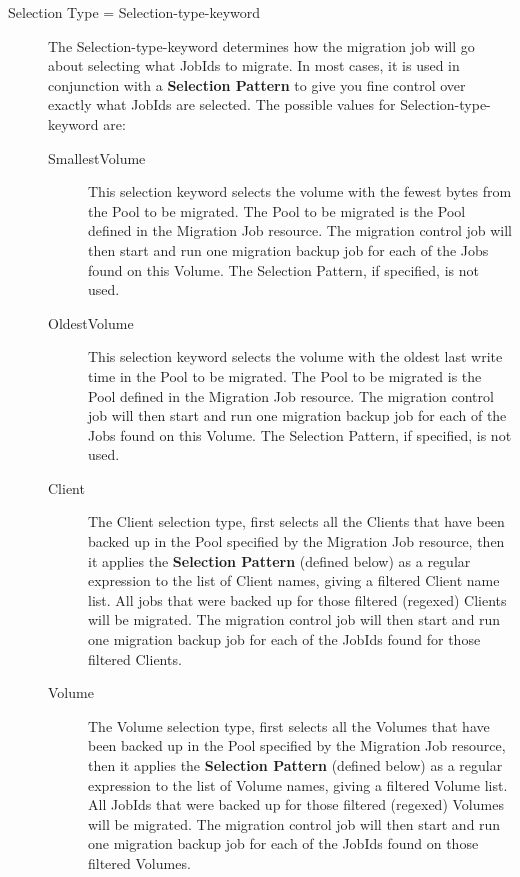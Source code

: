 \begin{description}
\item [Selection Type = \lt{}Selection-type-keyword\gt{}]  
  The \lt{}Selection-type-keyword\gt{} determines how the migration job
  will go about selecting what JobIds to migrate. In most cases, it is
  used in conjunction with a {\bf Selection Pattern} to give you fine
  control over exactly what JobIds are selected.  The possible values
  for \lt{}Selection-type-keyword\gt{} are:
  \begin{description}
  \item [SmallestVolume] This selection keyword selects the volume with the
        fewest bytes from the Pool to be migrated.  The Pool to be migrated
        is the Pool defined in the Migration Job resource.  The migration
        control job will then start and run one migration backup job for
        each of the Jobs found on this Volume.  The Selection Pattern, if
        specified, is not used.

  \item [OldestVolume] This selection keyword selects the volume with the
        oldest last write time in the Pool to be migrated.  The Pool to be
        migrated is the Pool defined in the Migration Job resource.  The
        migration control job will then start and run one migration backup
        job for each of the Jobs found on this Volume.  The Selection
        Pattern, if specified, is not used.

  \item [Client] The Client selection type, first selects all the Clients
        that have been backed up in the Pool specified by the Migration
        Job resource, then it applies the {\bf Selection Pattern} (defined
        below) as a regular expression to the list of Client names, giving
        a filtered Client name list.  All jobs that were backed up for those
        filtered (regexed) Clients will be migrated.
        The migration control job will then start and run one migration
        backup job for each of the JobIds found for those filtered Clients.

  \item [Volume] The Volume selection type, first selects all the Volumes
        that have been backed up in the Pool specified by the Migration
        Job resource, then it applies the {\bf Selection Pattern} (defined
        below) as a regular expression to the list of Volume names, giving
        a filtered Volume list.  All JobIds that were backed up for those
        filtered (regexed) Volumes will be migrated.
        The migration control job will then start and run one migration
        backup job for each of the JobIds found on those filtered Volumes.


\end{description}
\end{description}
